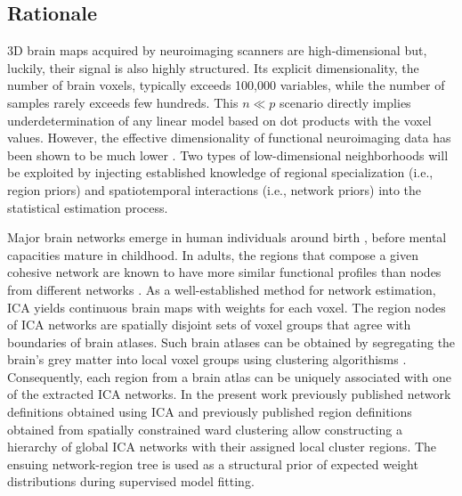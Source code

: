 \documentclass{article}
\begin{document}
\subsection{Rationale}
3D brain maps acquired by neuroimaging
scanners are high-dimensional but, luckily,
their signal is also highly structured.
Its explicit dimensionality, the number of brain voxels,
typically exceeds 100,000 variables, while the number
of samples rarely exceeds few hundreds.
This $n \ll p$ scenario directly implies underdetermination of any
linear model based on dot products with the voxel values.
However, the effective dimensionality of functional neuroimaging data has been
shown to be much lower \cite{bzdok2015semi}.
Two types of low-dimensional neighborhoods will be exploited by
injecting established knowledge of regional specialization
(i.e., region priors)
and spatiotemporal interactions
(i.e., network priors)
into the statistical estimation process.



Major brain networks emerge in human individuals around birth
\cite{doria2010}, before mental capacities mature in childhood. 
In adults,
the regions that compose
a given cohesive network are known to have more
similar functional profiles than nodes from different networks
\cite{anderson2013}.
As a well-established method for network estimation,
ICA \cite{beckmann2005} yields continuous brain maps with
weights for each voxel. The region nodes of ICA
networks are spatially disjoint sets of voxel groups that
agree with boundaries of brain atlases.
Such brain atlases can be obtained by segregating
the brain's grey matter into local voxel groups
using clustering algorithisms
\cite{cbp2015review}.
Consequently,
each region from a brain atlas can be uniquely associated with one of
the extracted ICA networks.
%
In the present work previously published network definitions
obtained using ICA \cite{smith2009}
and
previously published region definitions obtained from
spatially constrained ward clustering \cite{crad12}
allow constructing a hierarchy of global ICA networks with their
assigned local cluster regions.
The ensuing network-region tree is used as a structural prior
of expected weight distributions
during supervised model fitting.
\end{document}

